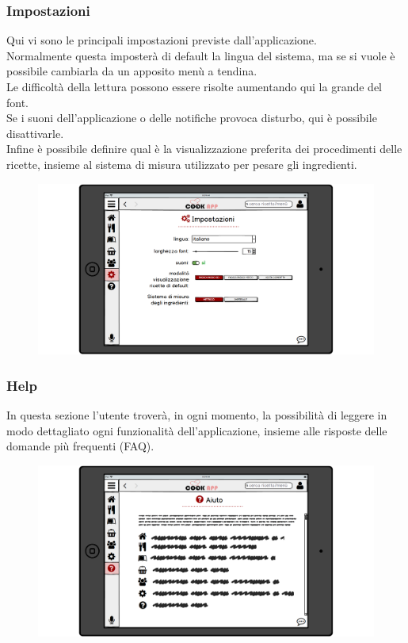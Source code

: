 \subsubsection{Impostazioni}
Qui vi sono le principali impostazioni previste dall'applicazione.\\ Normalmente questa imposterà di default la lingua del sistema, ma se si vuole è possibile cambiarla da un apposito menù a tendina.\\
Le difficoltà della lettura possono essere risolte aumentando qui la grande del font.\\
Se i suoni dell'applicazione o delle notifiche provoca disturbo, qui è possibile disattivarle.\\
Infine è possibile definire qual è la visualizzazione preferita dei procedimenti delle ricette, insieme al sistema di misura utilizzato per pesare gli ingredienti.\\
\begin{figure}[H]
	\centering
	\includegraphics[width=0.95\linewidth]{img/mockup/Impostazioni.png}
\end{figure}
\subsubsection{Help}
In questa sezione l'utente troverà, in ogni momento, la possibilità di leggere in modo dettagliato ogni funzionalità dell'applicazione, insieme alle risposte delle domande più frequenti (FAQ).
\begin{figure}[H]
	\centering
	\includegraphics[width=0.95\linewidth]{img/mockup/Help.png}
\end{figure}
